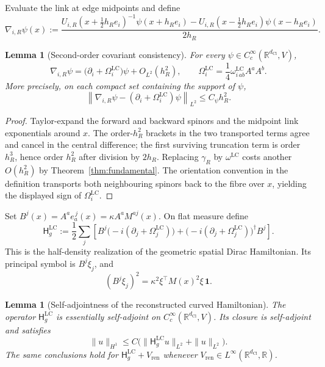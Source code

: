 \documentclass[11pt]{article}
\newtheorem{lemma}[theorem]{Lemma}
\theoremstyle{definition}
\theoremstyle{remark}
\newcommand{\R}{\mathbb{R}}
\newcommand{\dCl}{d_{\mathrm{Cl}}}
\newcommand{\one}{\mathbf{1}}
\newcommand{\Ham}{\mathsf{H}}
\begin{document}
Evaluate the link at edge midpoints and define
\[
  \nabla_{i,R}\psi(x)
  :=
  \frac{
   U_{i,R}(x+\tfrac12h_Re_i)^{-1}\psi(x+h_Re_i)
   -
   U_{i,R}(x-\tfrac12h_Re_i)\psi(x-h_Re_i)
  }{2h_R}.
\]

\begin{lemma}[Second-order covariant consistency]
\label{lem:covariant-consistency}
For every \(\psi\in C_c^\infty(\R^{\dCl},V)\),
\[
  \nabla_{i,R}\psi
  =
  \bigl(\partial_i+\Omega_i^{\mathrm{LC}}\bigr)\psi
  +O_{L^2}(h_R^2),
  \qquad
  \Omega_i^{\mathrm{LC}}
  =\frac14\omega^{\mathrm{LC}}_{i\,ab}A^aA^b .
\]
More precisely, on each compact set containing the support of \(\psi\),
\[
  \left\|
    \nabla_{i,R}\psi-
    (\partial_i+\Omega_i^{\mathrm{LC}})\psi
  \right\|_{L^2}
  \le C_\psi h_R^2 .
\]
\end{lemma}

\begin{proof}
Taylor-expand the forward and backward spinors and the midpoint link
exponentials around \(x\).  The order-\(h_R^2\) brackets in the two transported
terms agree and cancel in the central difference; the first surviving
truncation term is order \(h_R^3\), hence order \(h_R^2\) after division by
\(2h_R\).  Replacing \(\gamma_R\) by \(\omega^{\mathrm{LC}}\) costs another
\(O(h_R^2)\) by Theorem~\ref{thm:fundamental}.  The orientation convention
in the definition transports both neighbouring spinors back to the fibre over
\(x\), yielding the displayed sign of \(\Omega_i^{\mathrm{LC}}\).
\end{proof}

Set \(B^j(x)=A^ae_a^{\,j}(x)=\kappa A^aM^{aj}(x)\).  On flat measure define
\[
  \Ham_g^{\mathrm{LC}}
  :=
  \frac12\sum_j
  \left[
    B^j\bigl(-i(\partial_j+\Omega_j^{\mathrm{LC}})\bigr)
    +
    \bigl(-i(\partial_j+\Omega_j^{\mathrm{LC}})\bigr)^\dagger B^j
  \right].
\]
\label{def:curved-ham}
This is the half-density realization of the geometric spatial Dirac
Hamiltonian.  Its principal symbol is \(B^j\xi_j\), and
\[
  (B^j\xi_j)^2
  =\kappa^2\xi^\top M(x)^2\xi\,\one .
\]

\begin{lemma}[Self-adjointness of the reconstructed curved Hamiltonian]
\label{lem:curved-selfadjoint}
The operator \(\Ham_g^{\mathrm{LC}}\) is essentially self-adjoint on
\(C_c^\infty(\R^{\dCl},V)\).  Its closure is self-adjoint and satisfies
\[
  \|u\|_{H^1}
  \le C\bigl(\|\Ham_g^{\mathrm{LC}}u\|_{L^2}+\|u\|_{L^2}\bigr).
\]
The same conclusions hold for
\(\Ham_g^{\mathrm{LC}}+V_{\mathrm{ren}}\) whenever
\(V_{\mathrm{ren}}\in L^\infty(\R^{\dCl},\R)\).
\end{lemma}
\end{document}
